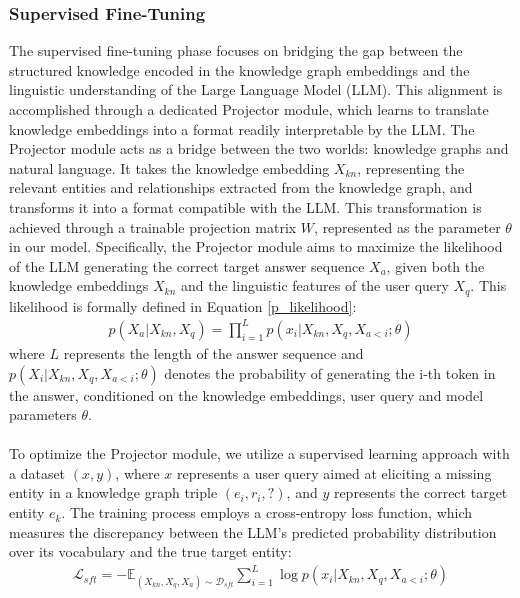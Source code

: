 \subsubsection{Supervised Fine-Tuning}
The supervised fine-tuning phase focuses on bridging the gap between the structured knowledge encoded in the knowledge graph embeddings and the linguistic understanding of the Large Language Model (LLM). This alignment is accomplished through a dedicated Projector module, which learns to translate knowledge embeddings into a format readily interpretable by the LLM.
The Projector module acts as a bridge between the two worlds: knowledge graphs and natural language. It takes the knowledge embedding $X_{kn}$, representing the relevant entities and relationships extracted from the knowledge graph, and transforms it into a format compatible with the LLM. This transformation is achieved through a trainable projection matrix $W$, represented as the parameter $\theta$ in our model.
Specifically, the Projector module aims to maximize the likelihood of the LLM generating the correct target answer sequence $X_a$, given both the knowledge embeddings $X_{kn}$ and the linguistic features of the user query $X_q$. This likelihood is formally defined in Equation \ref{p_likelihood}:
\begin{align}
\label{p_likelihood}
p(X_a|X_{kn},X_q) = \prod_{i=1}^L p(x_i|X_{kn},X_q,X_{a<i};\theta)
\end{align}
where $L$ represents the length of the answer sequence and $p(X_i|X_{kn},X_q,X_{a<i};\theta)$ denotes the probability of generating the i-th token in the answer, conditioned on the knowledge embeddings, user query and model parameters $\theta$.\\\\
To optimize the Projector module, we utilize a supervised learning approach with a dataset $(x, y)$, where $x$ represents a user query aimed at eliciting a missing entity in a knowledge graph triple $(e_i, r_i, ?)$, and $y$ represents the correct target entity $e_k$.
The training process employs a cross-entropy loss function, which measures the discrepancy between the LLM's predicted probability distribution over its vocabulary and the true target entity:
\begin{align}
\mathcal{L}_{sft} = - \mathbb{E}_{(X_{kn},X_q,X_a) \sim \mathcal{D}_{sft}}\sum_{i=1}^{L} \log p(x_i | X_{kn}, X_q, X_{a<i}; \theta)
\end{align}

